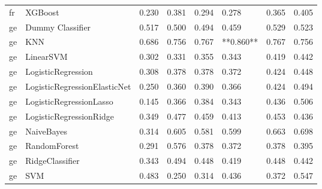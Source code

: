 \begin{tabular}{llllllll}
      fr &                      XGBoost & 0.230 &                     0.381 &                 0.294 &                  0.278 &                                   0.365 &     0.405 \\
      ge &             Dummy Classifier & 0.517 &                     0.500 &                 0.494 &                  0.459 &                                   0.529 &     0.523 \\
      ge &                          KNN & 0.686 &                     0.756 &                 0.767 &              **0.860** &                                   0.767 &     0.756 \\
      ge &                    LinearSVM & 0.302 &                     0.331 &                 0.355 &                  0.343 &                                   0.419 &     0.442 \\
      ge &           LogisticRegression & 0.308 &                     0.378 &                 0.378 &                  0.372 &                                   0.424 &     0.448 \\
      ge & LogisticRegressionElasticNet & 0.250 &                     0.360 &                 0.390 &                  0.366 &                                   0.424 &     0.494 \\
      ge &      LogisticRegressionLasso & 0.145 &                     0.366 &                 0.384 &                  0.343 &                                   0.436 &     0.506 \\
      ge &      LogisticRegressionRidge & 0.349 &                     0.477 &                 0.459 &                  0.413 &                                   0.453 &     0.436 \\
      ge &                   NaiveBayes & 0.314 &                     0.605 &                 0.581 &                  0.599 &                                   0.663 &     0.698 \\
      ge &                 RandomForest & 0.291 &                     0.576 &                 0.378 &                  0.372 &                                   0.378 &     0.395 \\
      ge &              RidgeClassifier & 0.343 &                     0.494 &                 0.448 &                  0.419 &                                   0.448 &     0.442 \\
      ge &                          SVM & 0.483 &                     0.250 &                 0.314 &                  0.436 &                                   0.372 &     0.547 \\

\end{tabular}
